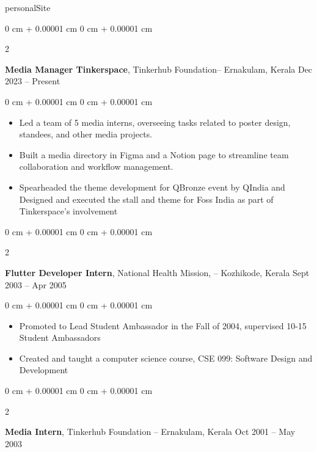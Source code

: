 personalSite\documentclass[10pt, letterpaper]{article}
\newenvironment{highlights}{
    \begin{itemize}[
        topsep=0.10 cm,
        parsep=0.10 cm,
        partopsep=0pt,
        itemsep=0pt,
        leftmargin=0 cm + 10pt
    ]
}{
    \end{itemize}
} %
\newenvironment{onecolentry}{
    \begin{adjustwidth}{
        0 cm + 0.00001 cm
    }{
        0 cm + 0.00001 cm
    }
}{
    \end{adjustwidth}
} %
\newenvironment{twocolentry}[2][]{
    \onecolentry
    \def\secondColumn{#2}
    \setcolumnwidth{\fill, 4.5 cm}
    \begin{paracol}{2}
}{
    \switchcolumn \raggedleft \secondColumn
    \end{paracol}
    \endonecolentry
} %
\begin{document}
        
        \begin{twocolentry}{
            Dec 2023 – Present
        }
            \textbf{Media Manager Tinkerspace}, Tinkerhub Foundation-- Ernakulam, Kerala\end{twocolentry}

        \vspace{0.10 cm}
        \begin{onecolentry}
            \begin{highlights}
                \item Led a team of 5 media interns, overseeing tasks related to poster design, standees, and other media projects.
                \item Built a media directory in Figma and a Notion page to streamline team collaboration and workflow management.
                \item Spearheaded the theme development for QBronze event by QIndia and Designed and executed the stall and theme for Foss India as part of Tinkerspace's involvement
            \end{highlights}
        \end{onecolentry}


        \vspace{0.2 cm}

        \begin{twocolentry}{
            Sept 2003 – Apr 2005
        }
            \textbf{Flutter Developer Intern}, National Health Mission, -- Kozhikode, Kerala\end{twocolentry}

        \vspace{0.10 cm}
        \begin{onecolentry}
            \begin{highlights}
                \item Promoted to Lead Student Ambassador in the Fall of 2004, supervised 10-15 Student Ambassadors
                \item Created and taught a computer science course, CSE 099: Software Design and Development
            \end{highlights}
        \end{onecolentry}


        \vspace{0.2 cm}

        \begin{twocolentry}{
            Oct 2001 – May 2003
        }
            \textbf{Media Intern}, Tinkerhub Foundation -- Ernakulam, Kerala\end{twocolentry}
\end{document}
